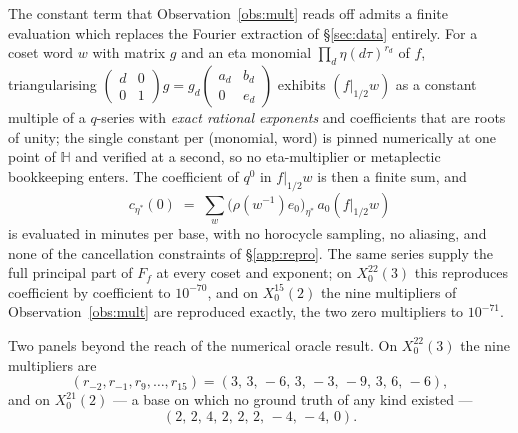 \documentclass[11pt,reqno]{amsart}
\theoremstyle{plain}
\theoremstyle{definition}
\newcommand{\HH}{\mathbb{H}}
\begin{document}
The constant term that Observation~\ref{obs:mult} reads off admits a finite evaluation which
replaces the Fourier extraction of \S\ref{sec:data} entirely. For a coset word $w$ with matrix
$g$ and an eta monomial $\prod_d\eta(d\tau)^{r_d}$ of $f$, triangularising
$\left(\begin{smallmatrix}d&0\\0&1\end{smallmatrix}\right)g=g_d
\left(\begin{smallmatrix}a_d&b_d\\0&e_d\end{smallmatrix}\right)$ exhibits
$(f\vert_{1/2}w)$ as a constant multiple of a $q$-series with \emph{exact rational exponents}
and coefficients that are roots of unity; the single constant per (monomial, word) is pinned
numerically at one point of $\HH$ and verified at a second, so no eta-multiplier or metaplectic
bookkeeping enters. The coefficient of $q^0$ in $f\vert_{1/2}w$ is then a finite sum, and
\[
  c_{\eta^*}(0)\;=\;\sum_{w}\bigl(\rho(w^{-1})e_0\bigr)_{\eta^*}\,a_0(f\vert_{1/2}w)
\]
is evaluated in minutes per base, with no horocycle sampling, no aliasing, and none of the
cancellation constraints of \S\ref{app:repro}. The same series supply the full principal part of
$F_f$ at every coset and exponent; on $X_0^{22}(3)$ this reproduces \cite[Lemma 24]{GY}
coefficient by coefficient to $10^{-70}$, and on $X_0^{15}(2)$ the nine multipliers of
Observation~\ref{obs:mult} are reproduced exactly, the two zero multipliers to $10^{-71}$.

Two panels beyond the reach of the numerical oracle result. On $X_0^{22}(3)$ the nine
multipliers are
\[
(r_{-2},r_{-1},r_9,\dots,r_{15})=(3,\,3,\,-6,\,3,\,-3,\,-9,\,3,\,6,\,-6),
\]
and on $X_0^{21}(2)$ --- a base on which no ground truth of any kind existed ---
\[
(2,\,2,\,4,\,2,\,2,\,2,\,-4,\,-4,\,0).
\]
\end{document}
